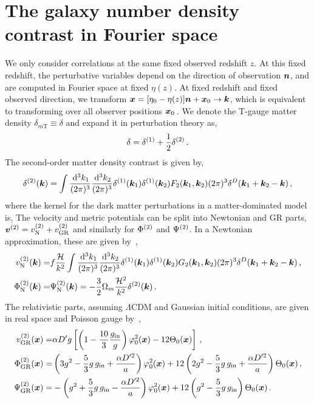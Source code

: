 \section{The galaxy number density contrast in Fourier space}
We only consider correlations at the same fixed observed redshift $z$. At this fixed redshift, the perturbative variables depend on the direction of observation $\bm {n}$, and are computed in Fourier space at fixed $\eta(z)$. At fixed redshift and fixed observed direction, we transform $\bm {x} = [\eta_0 - \eta(z)]\bm {n} + \bm {x}_0 \to \bm {k}$, which is equivalent to transforming over all observer positions $\bm {x}_0$\,. We denote the T-gauge matter density $\delta_{m\mathrm{T}} \equiv \delta$ and expand it in perturbation theory as, 
\begin{equation}
	\delta = \delta^{(1)} + \frac{1}{2} \delta^{(2)}\,.
\end{equation}
The second-order matter density contrast is given by,
\begin{equation}
	\delta^{(2)}(\bm {k}) = \int \frac{\,\mathrm{d}^3 k_1}{(2\pi)^3} \frac{\,\mathrm{d}^3 k_2}{(2\pi)^3} \delta^{(1)}(\bm {k}_1) \delta^{(1)}(\bm {k}_2) F_2(\bm {k}_1,\bm {k}_2)(2\pi)^3 \delta^D(\bm {k}_1+\bm {k}_2-\bm {k})\,,
\end{equation}
where the kernel for the dark matter perturbations in a matter-dominated model is, 
The velocity and metric potentials can be split into Newtonian and GR parts, $\bm{v}^{(2)} = v_{\mathrm{N}}^{(2)} + v_{\mathrm{GR}}^{(2)}$ and similarly for $\Phi^{(2)}$ and $\Psi^{(2)}$. In a Newtonian approximation, these are given by~\cite{Bernardeau:2001qr}, 
\begin{align}
	v^{(2)}_{\mathrm{N}}(\bm {k}) =& f \frac{\mathcal{H}}{k^2} \int \frac{\,\mathrm{d}^3 k_1}{(2\pi)^3} \frac{\,\mathrm{d}^3 k_2}{(2\pi)^3} \delta^{(1)}(\bm {k}_1) \delta^{(1)}(\bm {k}_2) G_2(\bm {k}_1,\bm {k}_2) (2\pi)^3 \delta^D(\bm {k}_1+\bm {k}_2-\bm {k})\,,\\
	\Phi^{(2)}_{\mathrm{N}}(\bm {k}) =& \Psi^{(2)}_{\mathrm{N}}(\bm {k}) = - \frac{3}{2} \Omega_m \frac{\mathcal{H}^2}{k^2} \delta^{(2)}(\bm {k})\,.
\end{align}
The relativistic parts, assuming $\Lambda$CDM and Gaussian initial conditions, are given in real space and Poisson gauge by~\cite{Villa:2015ppa},
\begin{align}
	v^{(2)}_{\mathrm{GR}}(\bm {x}) =& \alpha D' g \left[ \left( 1 - \frac{10}{3} \frac{g_\mathrm{in}}{g} \right) \varphi_0^2(\bm {x}) - 12 \Theta_0(\bm {x}) \right]\,, \\
	\Phi^{(2)}_{\mathrm{GR}}(\bm {x}) =& \left(3 g^2 - \frac{5}{3} g\,g_\mathrm{in} + \frac{\alpha D'^2}{a} \right) \varphi_0^2(\bm {x}) + 12 \left( 2 g^2 - \frac{5}{3} g\,g_\mathrm{in} + \frac{\alpha D'^2}{a} \right) \Theta_0(\bm {x})\,,\\
	\Psi^{(2)}_{\mathrm{GR}}(\bm {x}) =& - \left( g^2 + \frac{5}{3} g\,g_\mathrm{in} - \frac{\alpha D'^2}{a} \right) \varphi_0^2(\bm {x}) + 12 \left( g^2 - \frac{5}{3} g\,g_\mathrm{in} \right) \Theta_0(\bm {x})\,.
\end{align}
